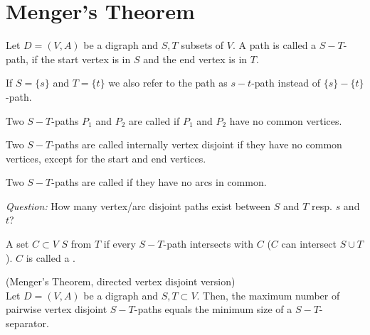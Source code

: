 \begin{lec}[2011-12-01]\end{lec}

\section*{Menger's Theorem}

\begin{defn}
Let $D = (V, A)$ be a digraph and $S, T$ subsets of $V$.
A path is called a $S-T$-path, if the start vertex is in $S$ and the end
vertex is in $T$.

If $S = \{s\}$ and $T = \{t\}$ we also refer to the path as $s-t$-path
instead of $\{s\}-\{t\}$-path.
\end{defn}

\begin{defn}
Two $S-T$-paths $P_1$ and $P_2$ are called
 if $P_1$ and $P_2$ have no common
vertices.

Two $S-T$-paths are called internally vertex disjoint if they have no common
vertices, except for the start and end vertices.

Two $S-T$-paths are called  if they have no
arcs in common.
\end{defn}
\emph{Question:} How many vertex/arc disjoint paths exist between $S$ and
$T$ resp. $s$ and $t$?

\begin{defn} 
A set $C \subset V$  $S$ from $T$ if every
$S-T$-path intersects with $C$ ($C$ can intersect $S \cup T$). $C$ is called
a . 
\end{defn}

\begin{thm}(Menger's Theorem, directed vertex disjoint version)\\
Let $D=(V,A)$ be a digraph and $S,T \subset V$. Then, the maximum number of
pairwise vertex disjoint $S-T$-paths equals the minimum size of a
$S-T$-separator.
\end{thm}

